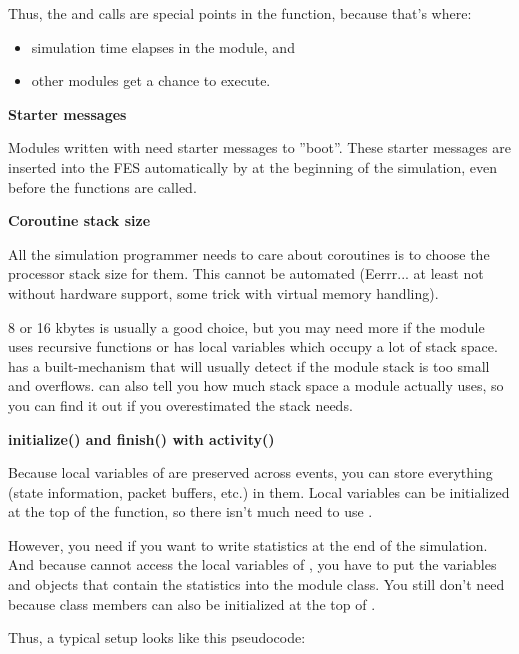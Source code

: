 Thus, the  and  calls are
special points in the  function, because that's
where:
\begin{itemize}
\item{simulation time elapses in the module, and}
\item{other modules get a chance to execute.}
\end{itemize}


\textbf{Starter messages}


Modules written with  need starter
messages to ''boot''.  These starter messages
are inserted into the FES automatically by {\opp} at the
beginning of the simulation, even before the 
functions are called.


\textbf{Coroutine stack size}


All the simulation programmer needs to care about coroutines is to
choose the processor stack size for them.
This cannot be automated (Eerrr... at least not without hardware
support, some trick with virtual memory handling).


8 or 16 kbytes is usually a good choice, but you may need more if the
module uses recursive functions or has local variables which occupy a
lot of stack space. {\opp} has a built-mechanism that will usually
detect if the module stack is too small and
overflows. {\opp} can also tell you how much
stack space a module actually uses, so you can find
it out if you overestimated the stack needs.


\textbf{initialize() and finish() with activity()}


Because local variables of  are preserved across
events, you can store everything (state information, packet buffers,
etc.) in them. Local variables can be initialized at the top of the
 function, so there isn't much need to use
.


However, you need  if you want to write statistics at
the end of the simulation. And because  cannot access
the local variables of , you have to put the variables
and objects that contain the statistics into the module class.
You still don't need  because class members can also
be initialized at the top of .


Thus, a typical setup looks like this pseudocode:


